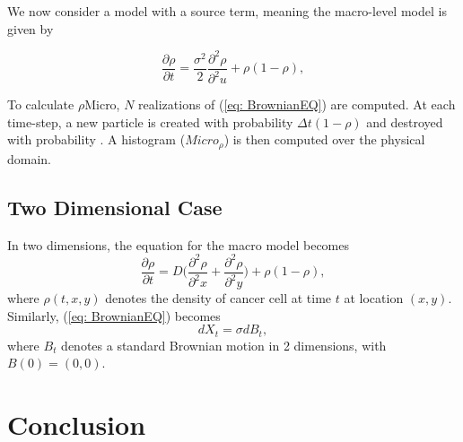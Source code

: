 \documentclass[10pt]{article}
\begin{document}
\noindent We now consider a model with a source term, meaning the macro-level model is given by

\begin{equation}
\frac{\partial \rho}{\partial t}  = \frac{\sigma^2}{2}\frac{\partial^2 \rho}{\partial^2 u} + \rho(1-\rho),
\label{eq: MacroModel2}
\end{equation}

To calculate $\rho$Micro, $N$ realizations of (\ref{eq: BrownianEQ}) are computed. At each time-step, a new particle is created with probability $\Delta t(1-\rho)$ and destroyed with probability . A histogram ($Micro_{\rho}$) is then 
computed over the physical domain. 

\subsection{Two Dimensional Case}

In two dimensions, the equation for the macro model becomes 
\begin{equation}
\frac{\partial \rho}{\partial t} = D\Big(\frac{\partial^2 \rho}{\partial^2 x} + \frac{\partial^2 \rho}{\partial^2 y}\Big) + \rho(1-\rho),
\label{eq: Macro2D}
\end{equation}
where $\rho(t,x,y)$ denotes the density of cancer cell at time $t$ at location $(x,y).$ Similarly, (\ref{eq: BrownianEQ}) becomes 
\begin{equation}
dX_t = \sigma dB_t,
\label{eq: MicroModel2}
\end{equation}
where $B_t$ denotes a standard Brownian motion in 2 dimensions, with $B(0) = (0,0)$. 


\section{Conclusion}
\label{sec: Conclusion}
\end{document}
